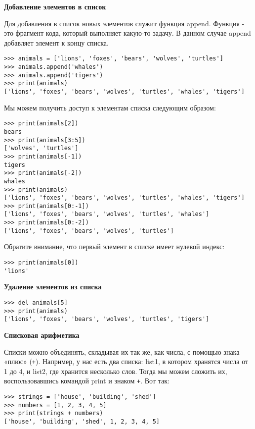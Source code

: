 \documentclass[11pt]{article}
\begin{document}
\textbf{Добавление элементов в список}

Для добавления в список новых элементов служит функция append. Функция -
это фрагмент кода, который выполняет какую-то задачу. В данном случае
append добавляет элемент к концу списка.

\begin{verbatim}
>>> animals = ['lions', 'foxes', 'bears', 'wolves', 'turtles']
>>> animals.append('whales')
>>> animals.append('tigers')
>>> print(animals)
['lions', 'foxes', 'bears', 'wolves', 'turtles', 'whales', 'tigers']
\end{verbatim}

Мы можем получить доступ к элементам списка следующим образом:

\begin{verbatim}
>>> print(animals[2])
bears
>>> print(animals[3:5])
['wolves', 'turtles']
>>> print(animals[-1])
tigers
>>> print(animals[-2])
whales
>>> print(animals)
['lions', 'foxes', 'bears', 'wolves', 'turtles', 'whales', 'tigers']
>>> print(animals[0:-1])
['lions', 'foxes', 'bears', 'wolves', 'turtles', 'whales']
>>> print(animals[0:-2])
['lions', 'foxes', 'bears', 'wolves', 'turtles']
\end{verbatim}

Обратите внимание, что первый элемент в списке имеет нулевой индекс:

\begin{verbatim}
>>> print(animals[0])
'lions'
\end{verbatim}

\textbf{Удаление элементов из списка}

\begin{verbatim}
>>> del animals[5]
>>> print(animals)
['lions', 'foxes', 'bears', 'wolves', 'turtles', 'tigers']
\end{verbatim}

\textbf{Списковая арифметика}

Списки можно объединять, складывая их так же, как числа, с помощью знака
«плюс» (\texttt{+}). Например, у нас есть два списка: list1, в котором
хранятся числа от 1 до 4, и list2, где хранится несколько слов. Тогда мы
можем сложить их, воспользовавшись командой print и знаком \texttt{+}.
Вот так:

\begin{verbatim}
>>> strings = ['house', 'building', 'shed']
>>> numbers = [1, 2, 3, 4, 5]
>>> print(strings + numbers)
['house', 'building', 'shed', 1, 2, 3, 4, 5]
\end{verbatim}
\end{document}
